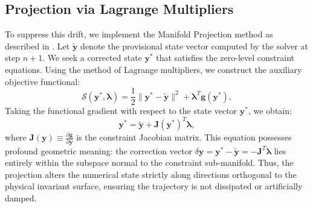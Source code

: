 \documentclass[11pt]{book}
\begin{document}
\subsection{Projection via Lagrange Multipliers}
To suppress this drift, we implement the Manifold Projection method as described in \cite{Hairer2006-te}. Let \(\tilde{\bm{y}}\) denote the provisional state vector computed by the solver at step \(n+1\). We seek a corrected state \(\bm{y}^*\) that satisfies the zero-level constraint equations. Using the method of Lagrange multipliers, we construct the auxiliary objective functional:
\begin{equation}
    \mathcal{S}(\bm{y}^*, \bm{\lambda}) = \frac{1}{2} \|\bm{y}^* - \tilde{\bm{y}}\|^2 + \bm{\lambda}^T \bm{g}(\bm{y}^*),
\end{equation}
Taking the functional gradient with respect to the state vector \(\bm{y}^*\), we obtain:
\begin{equation}
    \bm{y}^* = \tilde{\bm{y}} + \bm{J}(\bm{y}^*)^T \bm{\lambda},
\end{equation}
where \(\bm{J}(\bm{y}) \equiv \frac{\partial \bm{g}}{\partial \bm{y}}\) is the constraint Jacobian matrix. This equation possesses profound geometric meaning: the correction vector \(\delta\bm{y} = \bm{y}^* - \tilde{\bm{y}} = -\bm{J}^T \bm{\lambda}\) lies entirely within the subspace normal to the constraint sub-manifold. Thus, the projection alters the numerical state strictly along directions orthogonal to the physical invariant surface, ensuring the trajectory is not dissipated or artificially damped.
\end{document}
